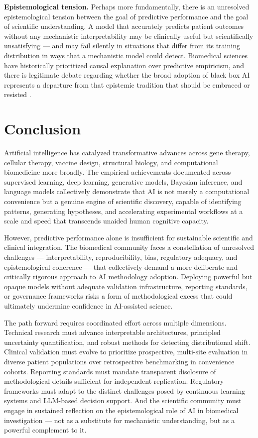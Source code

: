 \textbf{Epistemological tension.} Perhaps more fundamentally, there is an unresolved epistemological tension between the goal of predictive performance and the goal of scientific understanding. A model that accurately predicts patient outcomes without any mechanistic interpretability may be clinically useful but scientifically unsatisfying --- and may fail silently in situations that differ from its training distribution in ways that a mechanistic model could detect. Biomedical sciences have historically prioritized causal explanation over predictive empiricism, and there is legitimate debate regarding whether the broad adoption of black box AI represents a departure from that epistemic tradition that should be embraced or resisted \parencite{lipton2018}.

\section{Conclusion}

Artificial intelligence has catalyzed transformative advances across gene therapy, cellular therapy, vaccine design, structural biology, and computational biomedicine more broadly. The empirical achievements documented across supervised learning, deep learning, generative models, Bayesian inference, and language models collectively demonstrate that AI is not merely a computational convenience but a genuine engine of scientific discovery, capable of identifying patterns, generating hypotheses, and accelerating experimental workflows at a scale and speed that transcends unaided human cognitive capacity.

However, predictive performance alone is insufficient for sustainable scientific and clinical integration. The biomedical community faces a constellation of unresolved challenges --- interpretability, reproducibility, bias, regulatory adequacy, and epistemological coherence --- that collectively demand a more deliberate and critically rigorous approach to AI methodology adoption. Deploying powerful but opaque models without adequate validation infrastructure, reporting standards, or governance frameworks risks a form of methodological excess that could ultimately undermine confidence in AI-assisted science.

The path forward requires coordinated effort across multiple dimensions. Technical research must advance interpretable architectures, principled uncertainty quantification, and robust methods for detecting distributional shift. Clinical validation must evolve to prioritize prospective, multi-site evaluation in diverse patient populations over retrospective benchmarking in convenience cohorts. Reporting standards must mandate transparent disclosure of methodological details sufficient for independent replication. Regulatory frameworks must adapt to the distinct challenges posed by continuous learning systems and LLM-based decision support. And the scientific community must engage in sustained reflection on the epistemological role of AI in biomedical investigation --- not as a substitute for mechanistic understanding, but as a powerful complement to it.


